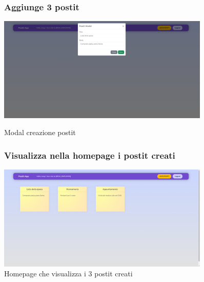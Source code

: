 \vspace*{\fill}
\begin{center}
    \begin{figure}[h]
        \centering
        \subsubsection{Aggiunge 3 postit}
        \includegraphics[width=0.9\textwidth]{images/3 aggiunta postit.png}
        \caption{Modal creazione postit}
         \subsubsection{Visualizza nella homepage i postit creati}
        \includegraphics[width=0.9\textwidth]{images/4 postit visualizzati.png}
        \caption{Homepage che visualizza i 3 postit creati}
        \label{fig:enter-label}
    \end{figure}
\end{center}
\vspace*{\fill}

\newpage

